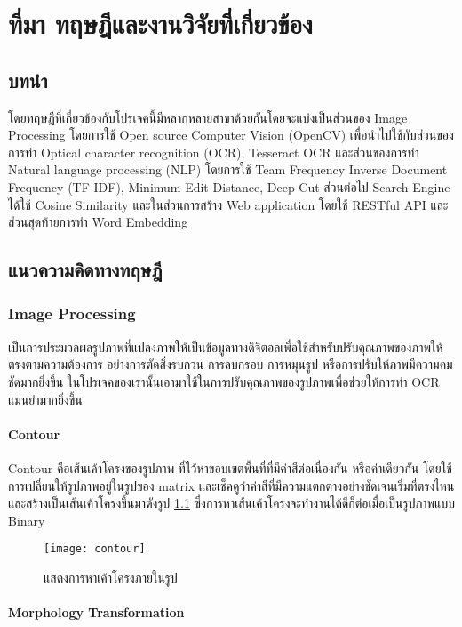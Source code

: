 \chapter{ที่มา ทฤษฎีและงานวิจัยที่เกี่ยวข้อง}
\section{บทนำ}

โดยทฤษฎีที่เกี่ยวข้องกับโปรเจคนี้มีหลากหลายสาขาด้วยกันโดยจะแบ่งเป็นส่วนของ Image Processing โดยการใช้ Open source Computer Vision (OpenCV) เพื่อนำไปใช้กับส่วนของการทำ Optical character recognition (OCR), Tesseract OCR และส่วนของการทำ Natural language processing (NLP) โดยการใช้ Team Frequency Inverse Document Frequency (TF-IDF), Minimum Edit Distance,  Deep Cut ส่วนต่อไป Search Engine ได้ใช้ Cosine Similarity และในส่วนการสร้าง Web application โดยใช้ RESTful API และส่วนสุดท้ายการทำ Word Embedding 

\section{แนวความคิดทางทฤษฎี}

\subsection{Image Processing}

เป็นการประมวลผลรูปภาพที่แปลงภาพให้เป็นข้อมูลทางดิจิตอลเพื่อใช้สำหรับปรับคุณภาพของภาพให้ตรงตามความต้องการ อย่างการตัดสิ่งรบกวน การลบกรอบ การหมุนรูป หรือการปรับให้ภาพมีความคมชัดมากยิ่งขึ้น ในโปรเจคของเรานั้นเอามาใช้ในการปรับคุณภาพของรูปภาพเพื่อช่วยให้การทำ OCR แม่นยำมากยิ่งขึ้น 

\subsubsection{Contour}

Contour \cite{doxygen} คือเส้นเค้าโครงของรูปภาพ ที่ไว้หาขอบเขตพื้นที่ที่มีค่าสีต่อเนื่องกัน หรือค่าเดียวกัน โดยใช้การเปลี่ยนให้รูปภาพอยู่ในรูปของ matrix และเช็คดูว่าค่าสีที่มีความแตกต่างอย่างชัดเจนเริ่มที่ตรงไหนและสร้างเป็นเส้นเค้าโครงขึ้นมาดังรูป \ref{fig:contour} ซึ่งการหาเส้นเค้าโครงจะทำงานได้ดีก็ต่อเมื่อเป็นรูปภาพแบบ Binary 

\begin{figure}[!h]
    \centering
    \texttt{[image: contour]}
    \caption{แสดงการหาเค้าโครงภายในรูป}\label{fig:contour}
\end{figure}

\subsubsection{Morphology Transformation}

